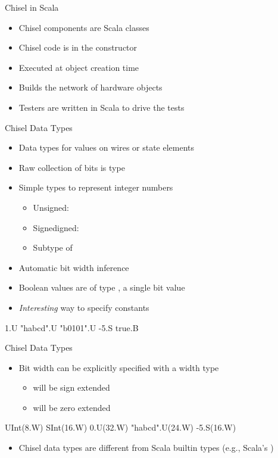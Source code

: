 \begin{frame}[fragile]{Chisel in Scala}
\begin{itemize}
\item Chisel components are Scala classes
\item Chisel code is in the constructor
\item Executed at object creation time
\item Builds the network of hardware objects
\item Testers are written in Scala to drive the tests
\end{itemize}
\end{frame}



\begin{frame}[fragile]{Chisel Data Types}
\begin{itemize}
\item Data types for values on wires or state elements
\item Raw collection of bits is type 
\item Simple types to represent integer numbers
\begin{itemize}
\item Unsigned: 
\item Signedigned: 
\item Subtype of 
\end{itemize}
\item Automatic bit width inference
\item Boolean values are of type , a single bit value
\item \emph{Interesting} way to specify constants
\end{itemize}
\begin{chisel}
1.U
"habcd".U
"b0101".U
-5.S
true.B
\end{chisel}
\end{frame}

\begin{frame}[fragile]{Chisel Data Types}
\begin{itemize}
\item Bit width can be explicitly specified with a width type
\begin{itemize}
\item {} will be sign extended
\item {} will be zero extended
\end{itemize}
\end{itemize}
\begin{chisel}
UInt(8.W)
SInt(16.W)
0.U(32.W)
"habcd".U(24.W)
-5.S(16.W)
\end{chisel}
\begin{itemize}
\item Chisel data types are different from Scala builtin types (e.g., Scala's )
\end{itemize}
\end{frame}

